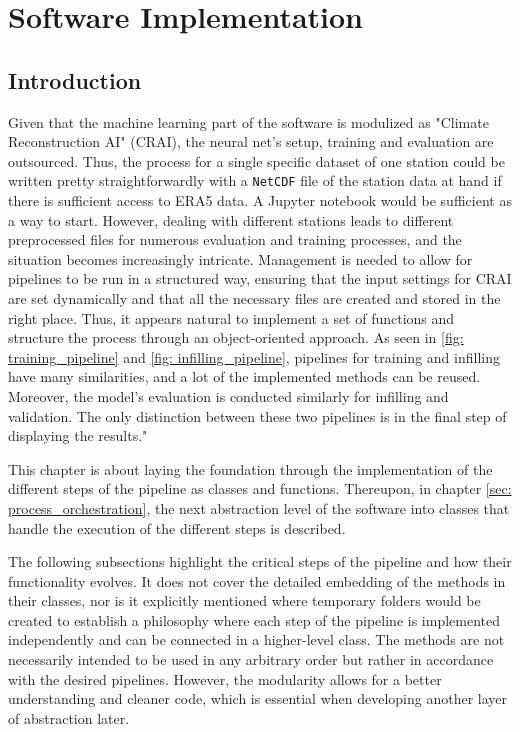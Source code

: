 \section{Software Implementation}
\label{sec: implementation}

\newcommand{\code}[1]{\texttt{#1}}

\subsection{Introduction}
\label{sec: implementation_introduction}

Given that the machine learning part of the software is modulized as "Climate Reconstruction AI" (CRAI), the neural net's setup, training and evaluation are outsourced.
Thus, the process for a single specific dataset of one station could be written pretty straightforwardly with a \code{NetCDF} file of the station data at hand if there is sufficient access to ERA5 data.
A Jupyter notebook would be sufficient as a way to start.
However, dealing with different stations leads to different preprocessed files for numerous evaluation and training processes, and the situation becomes increasingly intricate.
Management is needed to allow for pipelines to be run in a structured way, ensuring that the input settings for CRAI are set dynamically and that all the necessary files are created and stored in the right place.
Thus, it appears natural to implement a set of functions and structure the process through an object-oriented approach.
As seen in \autoref{fig: training_pipeline} and \autoref{fig: infilling_pipeline}, pipelines for training and infilling have many similarities, and a lot of the implemented methods can be reused.
Moreover, the model's evaluation is conducted similarly for infilling and validation.
The only distinction between these two pipelines is in the final step of displaying the results."

This chapter is about laying the foundation through the implementation of the different steps of the pipeline as classes and functions. Thereupon, in chapter \autoref{sec: process_orchestration}, the next abstraction level of the software into classes that handle the execution of the different steps is described.

The following subsections highlight the critical steps of the pipeline and how their functionality evolves.
It does not cover the detailed embedding of the methods in their classes, nor is it explicitly mentioned where temporary folders would be created to establish a philosophy where each step of the pipeline is implemented independently and can be connected in a higher-level class.
The methods are not necessarily intended to be used in any arbitrary order but rather in accordance with the desired pipelines.
However, the modularity allows for a better understanding and cleaner code, which is essential when developing another layer of abstraction later.

